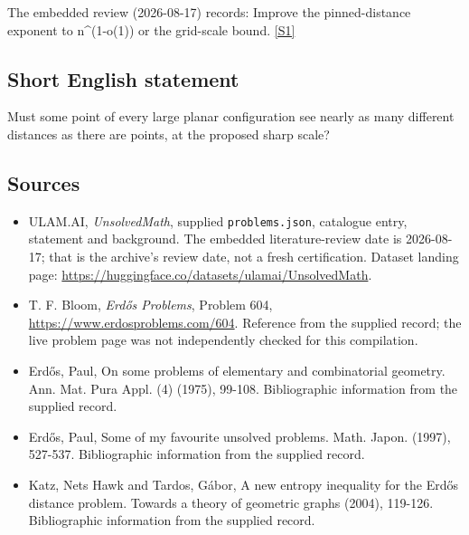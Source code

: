 \documentclass[11pt,a4paper]{article}
\newcommand{\sref}[2]{\hyperlink{source:#1:#2}{[S#2]}}
\begin{document}
The embedded review (2026-08-17) records: Improve the pinned-distance exponent to n\textasciicircum{}(1-o(1)) or the grid-scale bound. \sref{statement}{1}

\subsection{Short English statement}

Must some point of every large planar configuration see nearly as many different distances as there are points, at the proposed sharp scale?

\subsection{Sources}

{\small

\begin{itemize}

\item[\hypertarget{source:statement:1}{S1}] ULAM.AI, \emph{UnsolvedMath}, supplied \texttt{problems.json}, catalogue entry, statement and background. The embedded literature-review date is 2026-08-17; that is the archive’s review date, not a fresh certification. Dataset landing page: \url{https://huggingface.co/datasets/ulamai/UnsolvedMath}.

\item[\hypertarget{source:statement:2}{S2}] T. F. Bloom, \emph{Erdős Problems}, Problem 604, \url{https://www.erdosproblems.com/604}. Reference from the supplied record; the live problem page was not independently checked for this compilation.

\item[\hypertarget{source:statement:3}{S3}] Erd\H{o}s, Paul, On some problems of elementary and combinatorial geometry. Ann. Mat. Pura Appl. (4) (1975), 99-108. Bibliographic information from the supplied record.

\item[\hypertarget{source:statement:4}{S4}] Erd\H{o}s, Paul, Some of my favourite unsolved problems. Math. Japon. (1997), 527-537. Bibliographic information from the supplied record.

\item[\hypertarget{source:statement:5}{S5}] Katz, Nets Hawk and Tardos, G\'{a}bor, A new entropy inequality for the Erd\H{o}s distance problem. Towards a theory of geometric graphs (2004), 119-126. Bibliographic information from the supplied record.

\end{itemize}

}

\label{end:statement}
\end{document}
